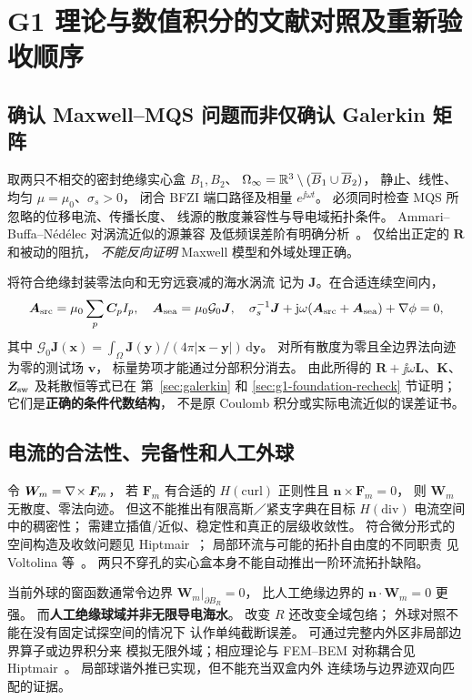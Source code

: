 \section{G1 理论与数值积分的文献对照及重新验收顺序}
\label{sec:g1-numerics-literature}

\subsection{确认 Maxwell--MQS 问题而非仅确认 Galerkin 矩阵}
取两只不相交的密封绝缘实心盒 $B_1,B_2$、
$\Omega_\infty=\mathbb R^3\setminus(\overline B_1\cup\overline B_2)$，
静止、线性、均匀 $\mu=\mu_0$、$\sigma_s>0$，
闭合 BFZI 端口路径及相量 $e^{\jj\omega t}$。
必须同时检查 MQS 所忽略的位移电流、传播长度、
线源的散度兼容性与导电域拓扑条件。
Ammari--Buffa--N\'ed\'elec 对涡流近似的源兼容
及低频误差阶有明确分析~\cite{ammaribuffanedelec2000}。
仅给出正定的 $\bm R$ 和被动的阻抗，
\emph{不能反向证明} Maxwell 模型和外域处理正确。

将符合绝缘封装零法向和无穷远衰减的海水涡流
记为 $\bm J$。在合适连续空间内，
\[
\bm A_{\rm src}=\mu_0\sum_p\bm C_pI_p,\quad
\bm A_{\rm sea}=\mu_0\mathcal G_0\bm J,\quad
\sigma_s^{-1}\bm J+\mathrm j\omega(\bm A_{\rm src}+
\bm A_{\rm sea})+\nabla\phi=0,
\]
其中 $\mathcal G_0\bm J(\bm x)=\int_{\Omega}
\bm J(\bm y)/(4\pi|\bm x-\bm y|)\,\mathrm d\bm y$。
对所有散度为零且全边界法向迹为零的测试场 $\bm v$，
标量势项才能通过分部积分消去。
由此所得的
$\bm R+\jj\omega\bm L$、$\bm K$、$\bm Z_{\rm sw}$
及耗散恒等式已在
第~\ref{sec:galerkin} 和 \ref{sec:g1-foundation-recheck} 节证明；
它们是\textbf{正确的条件代数结构}，
不是原 Coulomb 积分或实际电流近似的误差证书。

\subsection{电流的合法性、完备性和人工外球}
令 $\bm W_m=\nabla\!\times\bm F_m$，
若 $\bm F_m$ 有合适的 $H(\mathrm{curl})$ 正则性且
$\bm n\times\bm F_m=0$，
则 $\bm W_m$ 无散度、零法向迹。
但这不能推出有限高斯／紧支字典在目标
$H(\mathrm{div})$ 电流空间中的稠密性；
需建立插值/近似、稳定性和真正的层级收敛性。
符合微分形式的空间构造及收敛问题见
Hiptmair~\cite{hiptmair2002}；
局部环流与可能的拓扑自由度的不同职责
见 Voltolina 等~\cite{voltolina2021}。
两只不穿孔的实心盒本身不能自动推出一阶环流拓扑缺陷。

当前外球的窗函数通常令边界
$\bm W_m|_{\partial B_R}=0$，
比人工绝缘边界的 $\bm n\cdot\bm W_m=0$ 更强。
而\textbf{人工绝缘球域并非无限导电海水}。
改变 $R$ 还改变全域包络；
外球对照不能在没有固定试探空间的情况下
认作单纯截断误差。
可通过完整内外区非局部边界算子或边界积分来
模拟无限外域；相应理论与 FEM--BEM 对称耦合见
Hiptmair~\cite{hiptmair2001coupling}。
局部球谐外推已实现，但不能充当双盒内外
连续场与边界迹双向匹配的证据。

